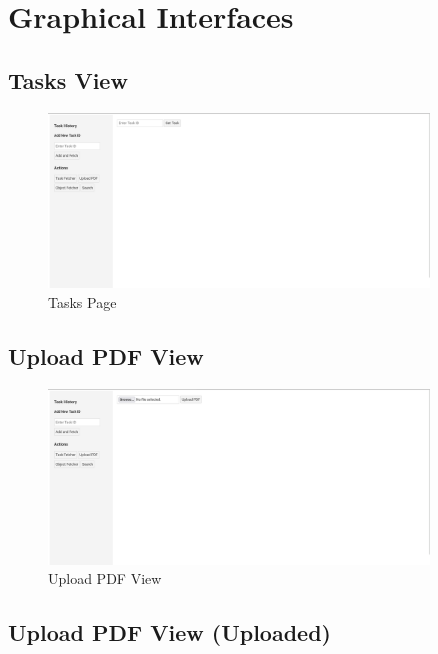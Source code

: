 \section{Graphical Interfaces}

\subsection{Tasks View}

\begin{figure}[H]
\centering
  \includegraphics[width=0.9\textwidth]{img/Interfaces/get_task.png}
\caption{Tasks Page}
\label{Tasks Page}      
\end{figure}

\subsection{Upload PDF View}

\begin{figure}[H]
\centering
  \includegraphics[width=0.9\textwidth]{img/Interfaces/upload_pdf.png}
\caption{Upload PDF View}
\label{Upload PDF View}      
\end{figure}

\subsection{Upload PDF View (Uploaded)}

